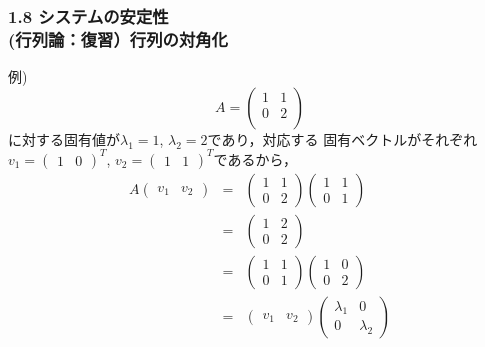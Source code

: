 \begin{frame}[t]
\frametitle{1.8 システムの安定性 \\
 (行列論：復習）行列の対角化}
例)
\[
 A = \left(
      \begin{array}{cc}
       1 & 1 \\
       0 & 2 \\
      \end{array}
     \right)
\]
に対する固有値が$\lambda_1 = 1$, $\lambda_2 = 2$であり，対応する
固有ベクトルがそれぞれ$v_1 = (\begin{array}{cc}1 & 0\end{array})^T$,
$v_2 = (\begin{array}{cc}1 & 1\end{array})^T$であるから，
\begin{eqnarray}
 A
 \left(
 \begin{array}{cc}
  v_1 & v_2
 \end{array}
 \right)
 &= &
 \left(
 \begin{array}{cc}
  1 & 1 \\
  0 & 2
 \end{array}
 \right)
 \left(
 \begin{array}{cc}
  1 & 1 \\
  0 & 1
 \end{array}
 \right) \\
 &=&
 \left(
 \begin{array}{cc}
  1 & 2 \\
  0 & 2
 \end{array}
 \right) \nonumber \\
 &=&
 \left(
 \begin{array}{cc}
  1 & 1 \\
  0 & 1
 \end{array}
 \right)
 \left(
 \begin{array}{cc}
  1 & 0 \\
  0 & 2
 \end{array}
 \right) \nonumber \\
 &=&
 \left(
 \begin{array}{cc}
  v_1 & v_2
 \end{array}
 \right)
 \left(
 \begin{array}{cc}
  \lambda_1 & 0 \\
  0 & \lambda_2
 \end{array}
 \right)
\end{eqnarray}
\end{frame}



